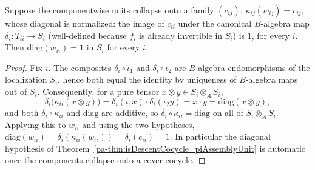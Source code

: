 \begin{theorem}
  \label{pa-thm:diagA_eq_one_of_componentCollapse}
  \leanok

  Suppose the componentwise units collapse onto a family \((c_{ij})\),
  \(\kappa_{ij}(w_{ij}) = c_{ij}\), whose diagonal is normalized: the image of \(c_{ii}\)
  under the canonical \(B\)-algebra map \(\delta_i \colon T_{ii} \to S_i\) (well-defined
  because \(f_i\) is already invertible in \(S_i\)) is \(1\), for every \(i\). Then
  \(\mathrm{diag}(w_{ii}) = 1\) in \(S_i\) for every \(i\).
\end{theorem}
\begin{proof}
  \leanok
  Fix \(i\). The composites \(\delta_i \circ \iota_1\) and \(\delta_i \circ \iota_2\) are
  \(B\)-algebra endomorphisms of the localization \(S_i\), hence both equal the identity by
  uniqueness of \(B\)-algebra maps out of \(S_i\). Consequently, for a pure tensor
  \(x \otimes y \in S_i \otimes_A S_i\),
  \[
    \delta_i\bigl(\kappa_{ii}(x \otimes y)\bigr)
      = \delta_i(\iota_1 x) \cdot \delta_i(\iota_2 y) = x \cdot y
      = \mathrm{diag}(x \otimes y) ,
  \]
  and both \(\delta_i \circ \kappa_{ii}\) and \(\mathrm{diag}\) are additive, so
  \(\delta_i \circ \kappa_{ii} = \mathrm{diag}\) on all of \(S_i \otimes_A S_i\). Applying this
  to \(w_{ii}\) and using the two hypotheses,
  \(\mathrm{diag}(w_{ii}) = \delta_i(\kappa_{ii}(w_{ii})) = \delta_i(c_{ii}) = 1\). In
  particular the diagonal hypothesis of
  Theorem~\ref{pa-thm:isDescentCocycle_piAssemblyUnit} is automatic once the components collapse
  onto a cover cocycle.
\end{proof}

